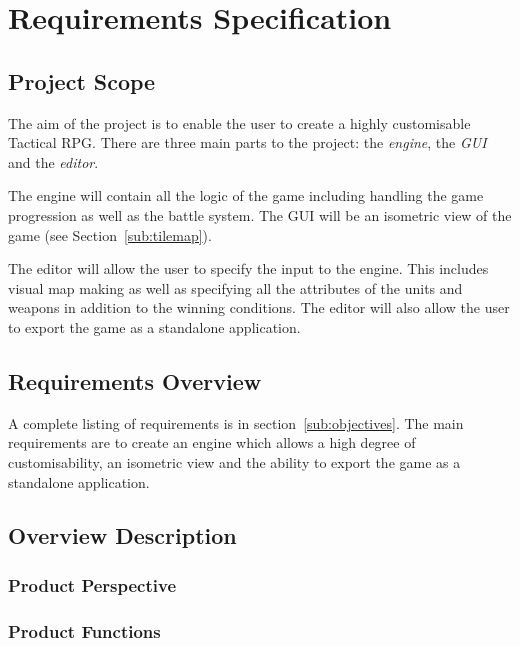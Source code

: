 \section{Requirements Specification}
\label{sec:requirements_specification}

\subsection{Project Scope}
\label{sub:project_scope}

The aim of the project is to enable the user to create a highly customisable Tactical RPG.  There are three main parts to the project: the \emph{engine}, the \emph{GUI} and the \emph{editor}.

The engine will contain all the logic of the game including handling the game progression as well as the battle system. The GUI will be an isometric view of the game (see Section~\ref{sub:tilemap}). 

The editor will allow the user to specify the input to the engine. This includes visual map making as well as specifying all the attributes of the units and weapons in addition to the winning conditions.  The editor will also allow the user to export the game as a standalone application.

\subsection{Requirements Overview}
\label{sub:overview}
A complete listing of requirements is in section~\ref{sub:objectives}. The main requirements are to create an engine which allows a high degree of customisability, an isometric view and the ability to export the game as a standalone application.  

\subsection{Overview Description}
\subsubsection{Product Perspective}

\subsubsection{Product Functions}



